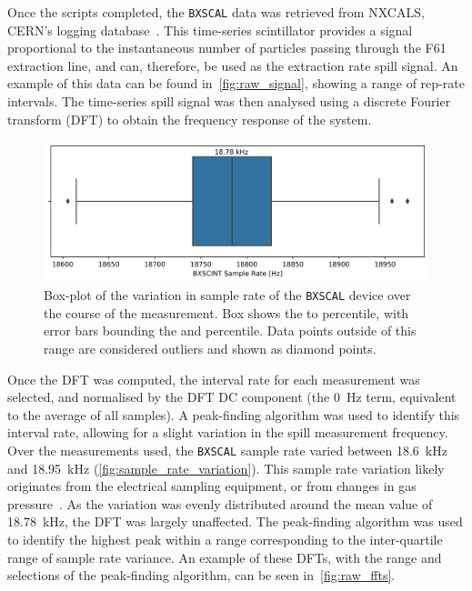\documentclass[a4paper,twoside,11pt]{report}
\begin{document}
Once the scripts completed, the \verb|BXSCAL| data was retrieved from NXCALS, CERN's logging database~\cite{nxcals}. This time-series scintillator provides a signal proportional to the instantaneous number of particles passing through the F61 extraction line, and can, therefore, be used as the extraction rate spill signal. An example of this data can be found in~\autoref{fig:raw_signal}, showing a range of rep-rate intervals. The time-series spill signal was then analysed using a discrete Fourier transform (DFT) to obtain the frequency response of the system. 


\begin{figure}
  \centering
  \includegraphics*[width=0.8\linewidth]{sample_rate_variation.png}
  \caption[Sample rate variation of the \texttt{BXSCAL} scintillator device]{Box-plot of the variation in sample rate of the \texttt{BXSCAL} device over the course of the measurement. Box shows the  to  percentile, with error bars bounding the  and  percentile. Data points outside of this range are considered outliers and shown as diamond points.}\label{fig:sample_rate_variation}
\end{figure}

Once the DFT was computed, the interval rate for each measurement was selected, and normalised by the DFT DC component (the \qty{0}{\hertz} term, equivalent to the average of all samples). A peak-finding algorithm was used to identify this interval rate, allowing for a slight variation in the spill measurement frequency. Over the measurements used, the \verb|BXSCAL| sample rate varied between \qty{18.6}{\kilo\hertz} and \qty{18.95}{\kilo\hertz} (\autoref{fig:sample_rate_variation}). This sample rate variation likely originates from the electrical sampling equipment, or from changes in gas pressure~\cite{PLUM200274}. As the variation was evenly distributed around the mean value of \qty{18.78}{\kilo\hertz}, the DFT was largely unaffected. The peak-finding algorithm was used to identify the highest peak within a range corresponding to the inter-quartile range of sample rate variance. An example of these DFTs, with the range and selections of the peak-finding algorithm, can be seen in~\autoref{fig:raw_ffts}.
\end{document}

